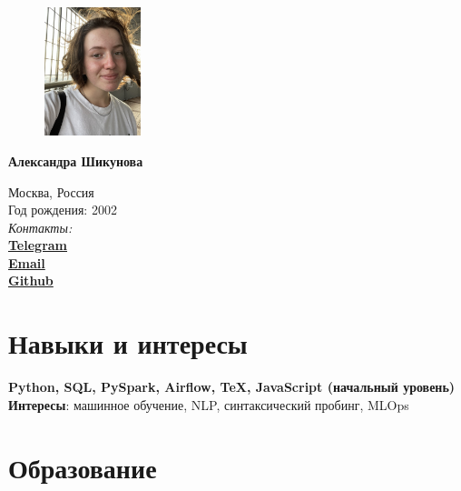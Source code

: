 \documentclass[11pt]{article} %
\begin{document}

\begin{figure} %
    \centering
    \includegraphics[width=0.25\textwidth]{photo}
\end{figure}
{\LARGE\bfseries Александра Шикунова} %
\bigskip\bigskip\medskip %

Москва, Россия\\
Год рождения: 2002\\

\textit{Контакты:}\\
\textbf{\href{https://t.me/thnlgrlivrlvdwsbrnwthrssnhrys}{Telegram}}\\
\textbf{\href{mailto:notalexandrashikunova@gmail.com}{Email}}\\
\textbf{\href{https://github.com/poisongrapevine}{Github}}
\medskip %


\section*{Навыки и интересы}

\textbf{Python, SQL, PySpark, Airflow, TeX, JavaScript (начальный уровень)}\\
\textbf{Интересы}: машинное обучение, NLP, синтаксический пробинг, MLOps


\section*{Образование}
\end{document}
